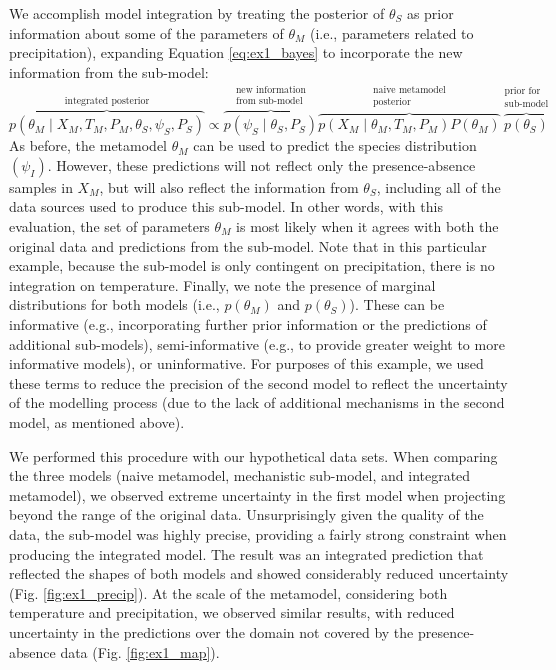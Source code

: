 We accomplish model integration by treating the posterior of \(\theta_S\) as prior information about some of the parameters of \(\theta_M\) (i.e., parameters related to precipitation), expanding Equation \ref{eq:ex1_bayes} to incorporate the new information from the sub-model:
\begin{equation}
	\label{eq:ex1_integrated}
	\overbrace{p(\theta_M \mid X_M, T_M, P_M, \theta_S, \psi_S, P_S)}^\text{integrated posterior}
	\propto
	\overbrace{p\left (\psi_S \mid \theta_S,P_S \right )}^{\substack{\text{new information} \\ \text{from sub-model}}}
	\overbrace{p \left(X_M \mid \theta_M, T_M, P_M \right) P \left(\theta_M \right)}^{\substack{\text{naive metamodel} \\ \text{posterior}}}
	\overbrace{p \left(\theta_S \right)}^{\substack{\text{prior for} \\ \text{sub-model}}}	
\end{equation}
As before, the metamodel \(\theta_M\) can be used to predict the species distribution \((\psi_I)\).
However, these predictions will not reflect only the presence-absence samples in \(X_M\), but will also reflect the information from \(\theta_S\), including all of the data sources used to produce this sub-model.
In other words, with this evaluation, the set of parameters $\theta_M$ is most likely when it agrees with both the original data and predictions from the sub-model. 
Note that in this particular example, because the sub-model is only contingent on precipitation, there is no integration on temperature. 
Finally, we note the presence of marginal distributions for both models (i.e., \(p(\theta_M)\) and \(p(\theta_S)\)).
These can be informative (e.g., incorporating further prior information or the predictions of additional sub-models), semi-informative (e.g., to provide greater weight to more informative models), or uninformative.
For purposes of this example, we used these terms to reduce the precision of the second model to reflect the uncertainty of the modelling process (due to the lack of additional mechanisms in the second model, as mentioned above).

We performed this procedure with our hypothetical data sets.
When comparing the three models (naive metamodel, mechanistic sub-model, and integrated metamodel), we observed extreme uncertainty in the first model when projecting beyond the range of the original data.
Unsurprisingly given the quality of the data, the sub-model was highly precise, providing a fairly strong constraint when producing the integrated model.
The result was an integrated prediction that reflected the shapes of both models and showed considerably reduced uncertainty (Fig. \ref{fig:ex1_precip}).
At the scale of the metamodel, considering both temperature and precipitation, we observed similar results, with reduced uncertainty in the predictions over the domain not covered by the presence-absence data (Fig. \ref{fig:ex1_map}).


